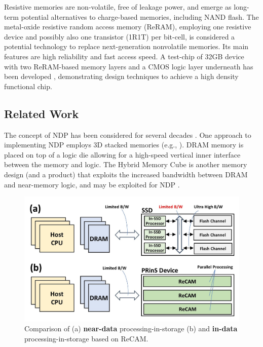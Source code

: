 \documentclass{superfri}
\begin{document}
Resistive memories are non-volatile, free of leakage power, and emerge as long-term potential alternatives to charge-based memories, including NAND flash. The metal-oxide resistive random access memory (ReRAM), employing one resistive device and possibly also one transistor (1R1T) per bit-cell, is considered a potential technology to replace next-generation nonvolatile memories. Its main features are high reliability and fast access speed. A test-chip of 32GB device with two ReRAM-based memory layers and a CMOS logic layer underneath has been developed \cite{ahn2015pim}, demonstrating design techniques to achieve a high density functional chip. 

\subsection{Related Work}
\label{sec:related_work}
The concept of NDP has been considered for several decades \cite{kogge1999short}. One approach to implementing NDP employs 3D stacked memories (e.g., \cite{ahn2015scalable}\cite{giridhar2013exploring}). DRAM memory is placed on top of a logic die allowing for a high-speed vertical inner interface between the memory and logic. The Hybrid Memory Cube \cite{liu2014swaphi} is another memory design (and a product) that exploits the increased bandwidth between DRAM and near-memory logic, and may be exploited for NDP \cite{azarkhish2017logic}. 

\begin{figure}[h!]
	\centerline{\includegraphics{Figures/In_vs_near_data.jpg}}
	\caption{Comparison of (a) \textbf{near-data} processing-in-storage (b) and \textbf{in-data} processing-in-storage based on ReCAM.}
	\label{fig:in_vs_near_data}
\end{figure}
\end{document}
